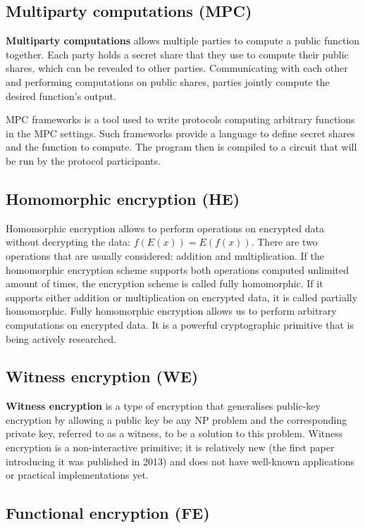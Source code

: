 \documentclass[
    9pt,            %
    report,        %
    affiltop,       %
]{art}
\begin{document}
\subsection{Multiparty computations (MPC)}

\textbf{Multiparty computations} allows multiple parties to compute a public function together. Each party holds a secret share that they use to compute their public shares, which can be revealed to other parties. Communicating with each other and performing computations on public shares, parties jointly compute the desired function's output. 

MPC frameworks is a tool used to write protocols computing arbitrary functions in the MPC settings. Such frameworks provide a language to define secret shares and the function to compute. The program then is compiled to a circuit that will be run by the protocol participants.

\subsection{Homomorphic encryption (HE)}

Homomorphic encryption allows to perform operations on encrypted data without decrypting the data: $f(E(x)) = E(f(x))$. There are two operations that are usually considered: addition and multiplication. If the homomorphic encryption scheme supports both operations computed unlimited amount of times, the encryption scheme is called fully homomorphic. If it supports either addition or multiplication on encrypted data, it is called partially homomorphic. Fully homomorphic encryption allows us to perform arbitrary computations on encrypted data. It is a powerful cryptographic primitive that is being actively researched.

\subsection{Witness encryption (WE)}

\textbf{Witness encryption} \cite{we} is a type of encryption that generalises public-key encryption by allowing a public key be any NP problem and the corresponding private key, referred to as a witness, to be a solution to this problem. Witness encryption is a non-interactive primitive; it is relatively new (the first paper introducing it was published in 2013) and does not have well-known applications or practical implementations yet.

\subsection{Functional encryption (FE)}
\end{document}
